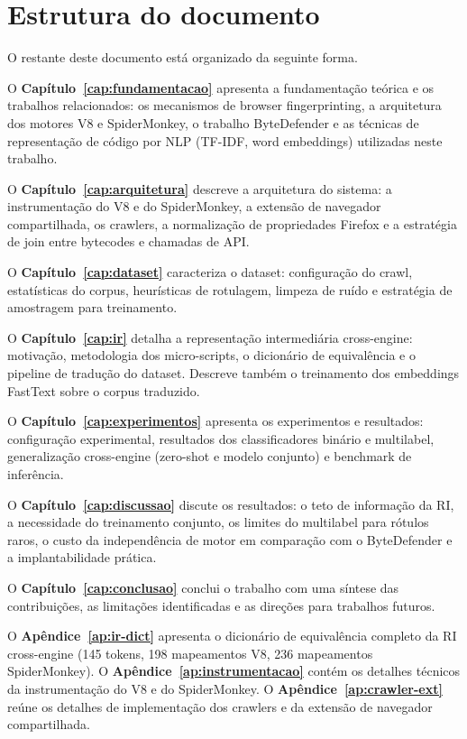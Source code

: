\section{Estrutura do documento}
\label{sec:estrutura}

O restante deste documento está organizado da seguinte forma.

O \textbf{Capítulo~\ref{cap:fundamentacao}} apresenta a fundamentação teórica e
os trabalhos relacionados: os mecanismos de browser fingerprinting, a
arquitetura dos motores V8 e SpiderMonkey, o trabalho ByteDefender e as técnicas
de representação de código por NLP (TF-IDF, word embeddings) utilizadas
neste trabalho.

O \textbf{Capítulo~\ref{cap:arquitetura}} descreve a arquitetura do sistema: a
instrumentação do V8 e do SpiderMonkey, a extensão de navegador compartilhada, os
crawlers, a normalização de propriedades Firefox e a estratégia de
join entre bytecodes e chamadas de API.

O \textbf{Capítulo~\ref{cap:dataset}} caracteriza o dataset: configuração do
crawl, estatísticas do corpus, heurísticas de rotulagem, limpeza de ruído e
estratégia de amostragem para treinamento.

O \textbf{Capítulo~\ref{cap:ir}} detalha a representação intermediária
cross-engine: motivação, metodologia dos micro-scripts, o dicionário de
equivalência e o pipeline de tradução do dataset. Descreve também o treinamento
dos embeddings FastText sobre o corpus traduzido.

O \textbf{Capítulo~\ref{cap:experimentos}} apresenta os experimentos e
resultados: configuração experimental, resultados dos classificadores binário e
multilabel, generalização cross-engine (zero-shot e modelo conjunto) e benchmark
de inferência.

O \textbf{Capítulo~\ref{cap:discussao}} discute os resultados: o teto de
informação da RI, a necessidade do treinamento conjunto, os limites do multilabel
para rótulos raros, o custo da independência de motor em comparação com o
ByteDefender e a implantabilidade prática.

O \textbf{Capítulo~\ref{cap:conclusao}} conclui o trabalho com uma síntese das
contribuições, as limitações identificadas e as direções para trabalhos futuros.

O \textbf{Apêndice~\ref{ap:ir-dict}} apresenta o dicionário de equivalência
completo da RI cross-engine (145 tokens, 198 mapeamentos V8, 236 mapeamentos
SpiderMonkey). O \textbf{Apêndice~\ref{ap:instrumentacao}} contém os detalhes
técnicos da instrumentação do V8 e do SpiderMonkey. O
\textbf{Apêndice~\ref{ap:crawler-ext}} reúne os detalhes de implementação dos
crawlers e da extensão de navegador compartilhada.
